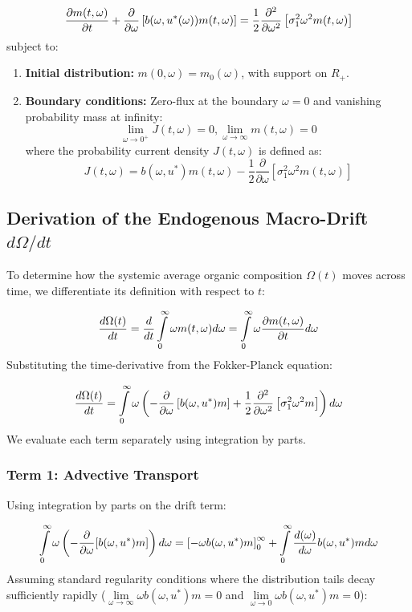 \documentclass[11pt,letterpaper]{report}
\newcommand{\fitmath}[1]{\begingroup\setbox0=\hbox{$\displaystyle #1$}\ifdim\wd0>\linewidth\resizebox{\linewidth}{!}{$\displaystyle #1$}\else\displaystyle #1\fi\endgroup}
\begin{document}
\[\fitmath{\frac{\partial m(t,\omega )}{\partial t}+\frac{\partial }{\partial \omega }\left[{b(\omega ,{u}^{*}(\omega ))m(t,\omega )}\right]=\frac{1}{2}\frac{{\partial }^{2}}{\partial {\omega }^{2}}\left[{{\sigma }_{1}^{2}{\omega }^{2}m(t,\omega )}\right]}\]
subject to:

\begin{enumerate}
\item \textbf{Initial distribution:} $m(0,\omega )={m}_{0}(\omega )$, with support on ${R}_{+}$.
\item \textbf{Boundary conditions:} Zero-flux at the boundary $\omega =0$ and vanishing probability mass at infinity:
\[
\lim\limits_{{\omega } \rightarrow {{0}^{+}}}J(t,\omega )=0,\lim\limits_{{\omega } \rightarrow {\infty }}m(t,\omega )=0
\]
where the probability current density $J(t,\omega )$ is defined as:
\[
J(t,\omega )=b(\omega ,{u}^{*})m(t,\omega )-\frac{1}{2}\frac{\partial }{\partial \omega }\left[{{\sigma }_{1}^{2}{\omega }^{2}m(t,\omega )}\right]
\]
\end{enumerate}
\subsection{Derivation of the Endogenous Macro-Drift \texorpdfstring{$d\Omega/dt$}{dOmega/dt}}
To determine how the systemic average organic composition $\Omega (t)$ moves across time, we differentiate its definition with respect to $t$:

\[\fitmath{\frac{d\Omega (t)}{dt}=\frac{d}{dt}\int\limits_{0}^{\infty }\omega m(t,\omega )d\omega =\int\limits_{0}^{\infty }\omega \frac{\partial m(t,\omega )}{\partial t}d\omega}\]
Substituting the time-derivative from the Fokker-Planck equation:

\[\fitmath{\frac{d\Omega (t)}{dt}=\int\limits_{0}^{\infty }\omega \left({-\frac{\partial }{\partial \omega }\left[{b(\omega ,{u}^{*})m}\right]+\frac{1}{2}\frac{{\partial }^{2}}{\partial {\omega }^{2}}\left[{{\sigma }_{1}^{2}{\omega }^{2}m}\right]}\right)d\omega}\]
We evaluate each term separately using integration by parts.

\subsubsection{Term 1: Advective Transport}
Using integration by parts on the drift term:

\[\fitmath{\int\limits_{0}^{\infty }\omega \left({-\frac{\partial }{\partial \omega }[b(\omega ,{u}^{*})m]}\right)d\omega ={\left[{-\omega b(\omega ,{u}^{*})m}\right]}_{0}^{\infty }+\int\limits_{0}^{\infty }\frac{d(\omega )}{d\omega }b(\omega ,{u}^{*})md\omega}\]
Assuming standard regularity conditions where the distribution tails decay sufficiently rapidly ($\lim\limits_{{\omega } \rightarrow {\infty }}\omega b(\omega ,{u}^{*})m=0$ and $\lim\limits_{{\omega } \rightarrow {0}}\omega b(\omega ,{u}^{*})m=0$):
\end{document}
